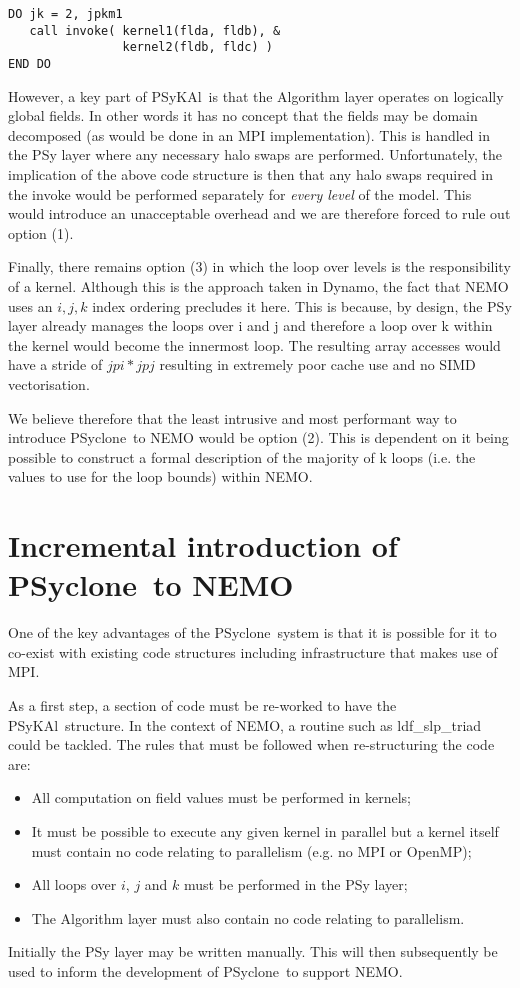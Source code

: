 \documentclass{article}
\newcommand{\psykal}{{PS}y{KA}l}
\newcommand{\psyclone}{{PS}yclone}
\begin{document}
\begin{verbatim}
DO jk = 2, jpkm1
   call invoke( kernel1(flda, fldb), &
                kernel2(fldb, fldc) )
END DO
\end{verbatim}

However, a key part of \psykal\ is that the Algorithm layer operates on
logically global fields. In other words it has no concept that the
fields may be domain decomposed (as would be done in an MPI
implementation). This is handled in the PSy layer where any necessary
halo swaps are performed. Unfortunately, the implication of the above
code structure is then that any halo swaps required in the invoke
would be performed separately for \emph{every level} of the
model. This would introduce an unacceptable overhead and we are
therefore forced to rule out option (1).

Finally, there remains option (3) in which the loop over levels is the
responsibility of a kernel. Although this is the approach taken in
Dynamo, the fact that NEMO uses an $i,j,k$ index ordering precludes it
here. This is because, by design, the PSy layer already manages the
loops over i and j and therefore a loop over k within the kernel would
become the innermost loop. The resulting array accesses would have a
stride of $jpi*jpj$ resulting in extremely poor cache use and no SIMD
vectorisation.

We believe therefore that the least intrusive and most performant way
to introduce \psyclone\ to NEMO would be option (2). This is dependent
on it being possible to construct a formal description of the majority
of k loops (i.e. the values to use for the loop bounds) within NEMO.

\section{Incremental introduction of \psyclone\ to NEMO}

One of the key advantages of the \psyclone\ system is that it is
possible for it to co-exist with existing code structures including
infrastructure that makes use of MPI.

As a first step, a section of code must be re-worked to have the
\psykal\ structure. In the context of NEMO, a routine such as
ldf\_slp\_triad could be tackled. The rules that must be followed when
re-structuring the code are:
\begin{itemize}
\item All computation on field values must be performed in kernels;
\item It must be possible to execute any given kernel in parallel but
  a kernel itself must contain no code relating to parallelism
  (e.g. no MPI or OpenMP);
\item All loops over $i$, $j$ and $k$ must be performed in the PSy
  layer;
\item The Algorithm layer must also contain no code relating to
  parallelism.
\end{itemize}
Initially the PSy layer may be written manually. This will then
subsequently be used to inform the development of \psyclone\ to support
NEMO.
\end{document}
